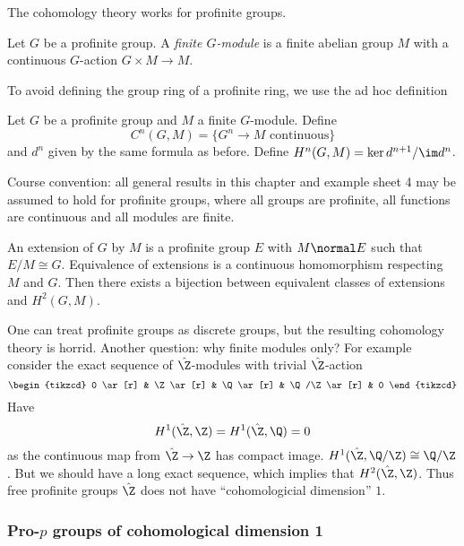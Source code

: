\documentclass[a4paper]{article}
\begin{document}
The cohomology theory works for profinite groups.

\begin{definition}[\(G\)-module]
  Let \(G\) be a profinite group. A \emph{finite \(G\)-module} is a finite abelian group \(M\) with a continuous \(G\)-action \(G \times M \to M\).
\end{definition}

To avoid defining the group ring of a profinite ring, we use the ad hoc definition

\begin{definition}
  Let \(G\) be a profinite group and \(M\) a finite \(G\)-module. Define
  \[
    C^n(G, M) = \{G^n \to M \text{ continuous}\}
  \]
  and \(d^n\) given by the same formula as before. Define \(H^n(G, M) = \ker d^{n + 1}/\im d^n\).
\end{definition}

Course convention: all general results in this chapter and example sheet 4 may be assumed to hold for profinite groups, where all groups are profinite, all functions are continuous and all modules are finite.

\begin{eg}
  An extension of \(G\) by \(M\) is a profinite group \(E\) with \(M \normal E\) such that \(E/M \cong G\). Equivalence of extensions is a continuous homomorphism respecting \(M\) and \(G\). Then there exists a bijection between equivalent classes of extensions and \(H^2(G, M)\).
\end{eg}

One can treat profinite groups as discrete groups, but the resulting cohomology theory is horrid. Another question: why finite modules only? For example consider the exact sequence of \(\hat \Z\)-modules with trivial \(\hat \Z\)-action
\[
  \begin{tikzcd}
    0 \ar[r] & \Z \ar[r] & \Q \ar[r] & \Q/\Z \ar[r] & 0
  \end{tikzcd}
\]
Have
\[
  H^1(\hat \Z, \Z) = H^1(\hat \Z, \Q) = 0
\]
as the continuous map from \(\hat \Z \to \Z\) has compact image. \(H^1(\hat \Z, \Q/\Z) \cong \Q/\Z\). But we should have a long exact sequence, which implies that \(H^2(\hat \Z, \Z)\). Thus free profinite groups \(\hat \Z\) does not have ``cohomologicial dimension'' \(1\).

\subsubsection{Pro-\(p\) groups of cohomological dimension 1}
\end{document}
